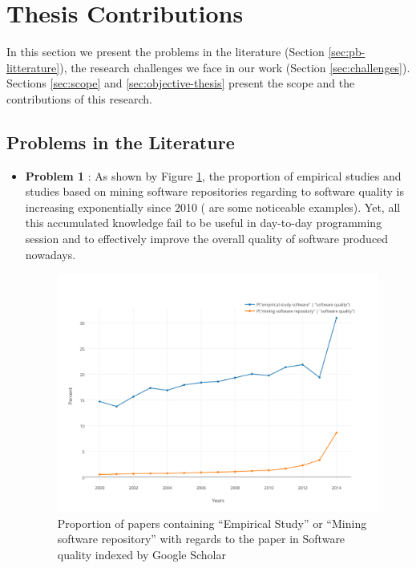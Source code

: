 \section{Thesis Contributions}


In this section we present the problems in the literature (Section \ref{sec:pb-litterature}), the research challenges we face in our work (Section \ref{sec:challenges}). Sections \ref{sec:scope} and \ref{sec:objective-thesis} present the scope and the contributions of this research.

\subsection{Problems in the Literature\label{sec:pb-litterature}}

\begin{itemize}
	\item {\bf Problem 1} : As shown by Figure \ref{fig:scholar}, the proportion of empirical studies and studies based on mining software repositories regarding to software quality is increasing exponentially since 2010 (\cite{Kim2011a,Lee2011a,Sun2011,Bhattacharya2011,Tian2012a,Zimmermann2012, Shang2013,Chen2014,Mcintosh,Hemmati2015} are some noticeable examples).
	Yet, all this accumulated knowledge fail to be useful in day-to-day programming session and to effectively improve the overall quality of software produced nowadays.

	\begin{figure}[h!]
	  \centering
	  	    \includegraphics[scale=0.7]{media/scholar.png}
	    \caption{Proportion of papers containing ``Empirical Study'' or ``Mining software repository'' with regards to the paper in Software quality indexed by Google Scholar	\label{fig:scholar}}
	\end{figure}


\end{itemize}
